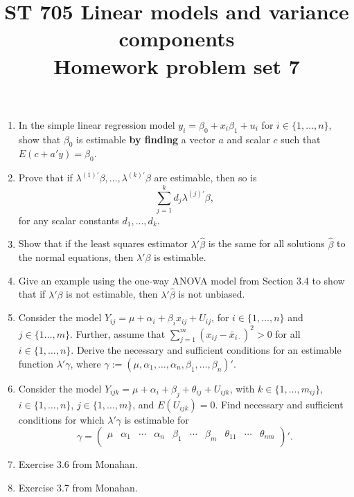 \documentclass[11pt]{article}
\title{ST 705 Linear models and variance components \\ 
        Homework problem set 7}
\begin{document}
\maketitle

\begin{enumerate}

\item In the simple linear regression model $y_{i} = \beta_{0} + x_{i}\beta_{1} + u_{i}$ for $i \in \{1,\dots,n\}$, show that $\beta_{0}$ is estimable \textbf{by finding} a vector $a$ and scalar $c$ such that $E(c + a'y) = \beta_{0}$.

\item Prove that if $\lambda^{(1)'}\beta,\dots,\lambda^{(k)'}\beta$ are estimable, then so is 
\[
\sum_{j=1}^{k}d_{j}\lambda^{(j)'}\beta,
\]
for any scalar constants $d_{1},\dots,d_{k}$.

\item Show that if the least squares estimator $\lambda'\widehat{\beta}$ is the same for all solutions $\widehat{\beta}$ to the normal equations, then $\lambda'\beta$ is estimable.

\item Give an example using the one-way ANOVA model from Section 3.4 to show that if $\lambda'\beta$ is not estimable, then $\lambda'\widehat{\beta}$ is not unbiased.

\item Consider the model $Y_{ij} = \mu + \alpha_{i} + \beta_{i}x_{ij} + U_{ij}$, for $i \in \{1,\dots,n\}$ and $j \in \{1\dots,m\}$.  Further, assume that $\sum_{j=1}^{m}(x_{ij} - \bar{x}_{i\cdot})^{2} > 0$ for all $i \in \{1,\dots,n\}$.  Derive the necessary and sufficient conditions for an estimable function $\lambda'\gamma$, where $\gamma := (\mu,\alpha_{1},\dots,\alpha_{n},\beta_{1},\dots,\beta_{n})'$.

\item Consider the model $Y_{ijk} = \mu + \alpha_{i} + \beta_{j} + \theta_{ij} + U_{ijk}$, with $k \in \{1,\dots,m_{ij}\}$, $i \in \{1,\dots,n\}$, $j \in \{1,\dots,m\}$, and $E(U_{ijk}) = 0$.  Find necessary and sufficient conditions for which $\lambda'\gamma$ is estimable for 
\[
\gamma =
\begin{pmatrix}
\mu & \alpha_{1} & \cdots & \alpha_{n} & \beta_{1} & \cdots & \beta_{m} & \theta_{11} & \cdots & \theta_{nm} \\
\end{pmatrix}'.
\]

\item Exercise 3.6 from Monahan.

\item Exercise 3.7 from Monahan.




\end{enumerate}
\end{document}
